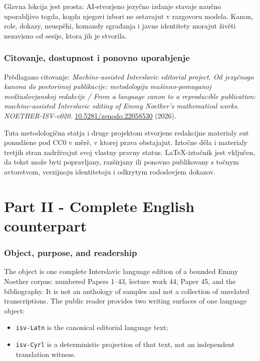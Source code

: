 \documentclass[11pt]{article}
\newcommand{\code}[1]{\texttt{#1}}
\newcommand{\doiurl}[1]{\href{https://doi.org/#1}{#1}}
\begin{document}
Glavna lekcija jest prosta: AI-stvorjeno jezyčno izdanje stavaje naučno uporabljivo togda, kogda njegovi izbori ne ostavajut v razgovoru modela. Kanon, role, dokazy, neuspěhi, komandy sgrađanja i javne identitety morajut živěti nezavisno od sesije, ktora jih je stvorila.

\section*{Citovanje, dostupnost i ponovno uporabjenje}

Prědlagano citovanje: \emph{Machine-assisted Interslavic editorial project. Od jezyčnogo kanona do povtorimoj publikacije: metodologija mašinno-pomaganoj medžuslovjanskoj redakcije / From a language canon to a reproducible publication: machine-assisted Interslavic editing of Emmy Noether's mathematical works. NOETHER-ISV-v020.} \doiurl{10.5281/zenodo.22058530} (2026).

Tuta metodologična statja i druge projektom stvorjene redakcijne materialy sut ponudžene pod CC0 v měrě, v ktorej prava obstajajut. Iztočne děla i materialy tretjih stran zadrživajut svoj vlastny pravny status. LaTeX-iztočnik jest vključen, da tekst može byti popravljany, razširjany ili ponovno publikovany s točnym avtorstvom, verzijnoju identitetoju i odkrytym rodoslovjem dokazov.

\clearpage
\part*{Part II - Complete English counterpart}

\section{Object, purpose, and readership}

The object is one complete Interslavic language edition of a bounded Emmy Noether corpus: numbered Papers 1--43, lecture work 44, Paper 45, and the bibliography. It is not an anthology of samples and not a collection of unrelated transcriptions. The public reader provides two writing surfaces of one language object:

\begin{itemize}
\item \code{isv-Latn} is the canonical editorial language text;
\item \code{isv-Cyrl} is a deterministic projection of that text, not an independent translation witness.
\end{itemize}
\end{document}
